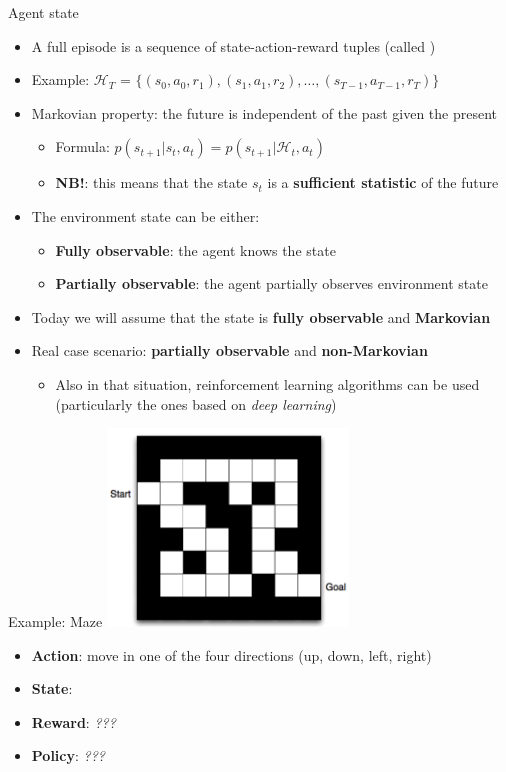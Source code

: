 \documentclass[presentation, 9pt]{beamer}\mode<presentation>{\usetheme{AMSBolognaFC}}
\begin{document}
\begin{frame}{Agent state}
\begin{itemize}
	\item A full episode is a sequence of state-action-reward tuples (called )
	
	\item Example: $\mathcal{H}_T$ = $\{ (s_0, a_0, r_1), (s_1, a_1, r_2), \dots, (s_{T-1}, a_{T-1}, r_T) \}$
	\item Markovian property: the future is independent of the past given the present
	\begin{itemize}
		\item Formula: $p(s_{t+1} | s_t, a_t) = p(s_{t+1} | \mathcal{H}_t, a_t)$
		\item \textbf{NB!}: this means that the state $s_t$ is a \textbf{sufficient statistic} of the future
	\end{itemize}
	\item The environment state can be either:
	\begin{itemize}
		\item \textbf{Fully observable}: the agent knows the state
		\item \textbf{Partially observable}: the agent partially observes environment state 
	\end{itemize}
	\item Today we will assume that the state is \textbf{fully observable} and \textbf{Markovian}
	\item Real case scenario: \textbf{partially observable} and \textbf{non-Markovian}
	\begin{itemize}
		\item Also in that situation, reinforcement learning algorithms can be used (particularly the ones based on \emph{deep learning})
	\end{itemize}
\end{itemize}
\end{frame}
\begin{frame}{Example: Maze}
\centering
\includegraphics[width=0.48\textwidth]{img/maze.png}

\begin{itemize}
	\item \textbf{Action}: move in one of the four directions (up, down, left, right)
	\item \textbf{State}: \only<2>{
		\emph{position in the maze}}
	\item \textbf{Reward}: \emph{???}
	\item \textbf{Policy}: \emph{???}
\end{itemize}
\end{frame}
\end{document}
